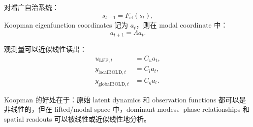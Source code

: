 \documentclass[11pt,a4paper]{ctexart}
\begin{document}
对增广自治系统：
\begin{equation}
    s_{t+1}=F_{\mathrm{cl}}(s_t),
\end{equation}
Koopman eigenfunction coordinates 记为 $a_t$，则在 modal coordinate 中：
\begin{equation}
    a_{t+1}=\Lambda a_t.
\end{equation}

观测量可以近似线性读出：
\begin{align}
    u_{\mathrm{LFP},t} &= C_u a_t, \\
    y_{\mathrm{localBOLD},t} &= C_l a_t, \\
    y_{\mathrm{globalBOLD},t} &= C_g a_t.
\end{align}

Koopman 的好处在于：原始 latent dynamics 和 observation functions 都可以是非线性的，但在 lifted/modal space 中，dominant modes、phase relationships 和 spatial readouts 可以被线性或近似线性地分析。
\end{document}
